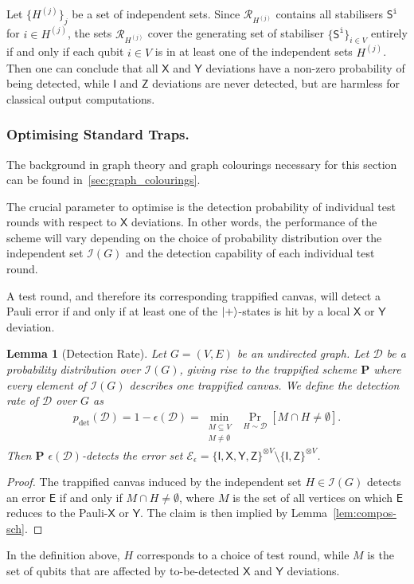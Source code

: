 \documentclass[12pt]{iopart}
\newcommand{\cptp}[1]{\mathsf{#1}} \newcommand{\pd}[1]{\mathcal{#1}}  \newcommand{\sch}[1]{\bm{#1}}
\newcommand{\Id}{\cptp{I}}
\newcommand{\X}{\cptp{X}}
\newcommand{\Z}{\cptp{Z}}
\newcommand{\Y}{\cptp{Y}}
\renewcommand{\1}{\mathds{1}}
\newtheorem{lemma}{Lemma}
\begin{document}
Let $\{H^{(j)}\}_j$ be a set of independent sets. 
Since $\mathcal{R}_{H^{(j)}}$ contains all stabilisers $\cptp S^{\mathtt{i}}$ for $i \in H^{(j)}$,
the sets $\mathcal{R}_{H^{(j)}}$ cover the generating set of stabiliser
$\{\cptp S^{\mathtt{i}}\}_{i \in V}$ entirely if and only if
each qubit $i \in V$ is in at least one of the
independent sets $H^{(j)}$. Then one can conclude that all $\X$ and $\Y$
deviations have a non-zero probability of being detected, while $\Id$
and $\Z$ deviations are never detected, but are harmless 
for classical output computations.

\subsubsection{Optimising Standard Traps.}
The background in graph theory and graph colourings necessary for this section can be found in~\ref{sec:graph_colourings}.

The crucial parameter to optimise is the detection probability of individual test rounds with respect to $\X$ deviations.
In other words, the performance of the scheme will vary depending on the choice of probability distribution over the independent set $\mathcal I(G)$ and the detection capability of each individual test round.

A test round, and therefore its corresponding trappified canvas, will detect a Pauli error if and only if at least one of the $\ket +$-states is hit by a local $\X$ or $\Y$ deviation.

\begin{lemma}[Detection Rate]
  Let $G=(V,E)$ be an undirected graph. Let $\pd D$ be a probability distribution over $\mathcal I(G)$, giving rise to the trappified scheme $\sch P$ where every element of $\mathcal{I}(G)$ describes one trappified canvas. We define the \emph{detection rate} of $\pd D$ over $G$ as
  \begin{align}
    p_\text{det}(\pd D) = 1 - \epsilon(\pd D) = \min_{\substack{M \subseteq V \\ M \neq \emptyset}} \;\Pr_{H \sim \pd D} \left[ M \cap H  \neq \emptyset \right].
  \end{align}
  Then $\sch P$ $\epsilon(\pd D)$-detects the error set $\mathcal{E}_\epsilon = \{\cptp I,\X,\Y,\Z \}^{\otimes V} \setminus \{ \cptp I,\Z \}^{\otimes V}$.
\end{lemma}
\begin{proof}
	The trappified canvas induced by the independent set $H \in \mathcal{I}(G)$ detects an error $\cptp E$ if and only if $M \cap H \neq \emptyset$, where $M$ is the set of all vertices on which $\cptp E$ reduces to the Pauli-$\X$ or $\Y$. The claim is then implied by Lemma~\ref{lem:compos-sch}.
\end{proof}
In the definition above, $H$ corresponds to a choice of test round, while $M$ is the set of qubits that are affected by to-be-detected $\X$ and $\Y$ deviations.
\end{document}
